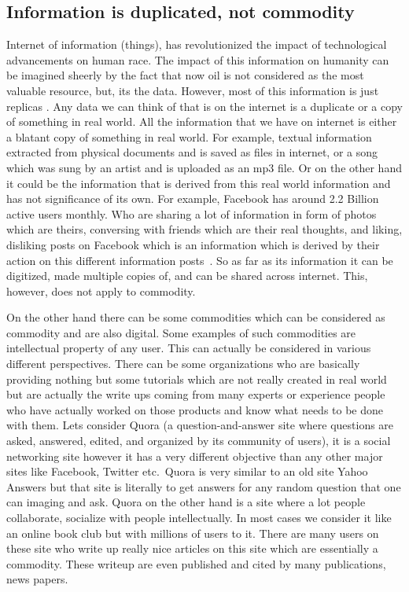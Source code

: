 \subsection{Information is duplicated, not commodity}

Internet of information (things), has revolutionized the impact of
technological advancements on human race. The impact of this
information on humanity can be imagined sheerly by the fact that now
oil is not considered as the most valuable resource, but, its the
data. However, most of this information is just replicas
\cite{economist5}. Any data we can think of that is on the internet is
a duplicate or a copy of something in real world. All the information
that we have on internet is either a blatant copy of something in real
world. For example, textual information extracted from physical
documents and is saved as files in internet, or a song which was sung
by an artist and is uploaded as an mp3 file. Or on the other hand it
could be the information that is derived from this real world
information and has not significance of its own. For example, Facebook
has around 2.2 Billion active users monthly. Who are sharing a lot of
information in form of photos which are theirs, conversing with
friends which are their real thoughts, and liking, disliking posts on
Facebook which is an information which is derived by their action on
this different information posts~\cite{statista6}. So as far as its
information it can be digitized, made multiple copies of, and can be
shared across internet. This, however, does not apply to commodity.


On the other hand there can be some commodities which can be
considered as commodity and are also digital. Some examples of such
commodities are intellectual property of any user. This can actually
be considered in various different perspectives. There can be some
organizations who are basically providing nothing but some tutorials
which are not really created in real world but are actually the write
ups coming from many experts or experience people who have actually
worked on those products and know what needs to be done with them.
Lets consider Quora (a question-and-answer site where
  questions are asked, answered, edited, and organized by its
  community of users), it is a social networking site however it has a
very different objective than any other major sites like Facebook,
Twitter etc.\ Quora is very similar to an old site Yahoo Answers but
that site is literally to get answers for any random question that one
can imaging and ask. Quora on the other hand is a site where a lot
people collaborate, socialize with people intellectually. In most
cases we consider it like an online book club but with millions of
users to it. There are many users on these site who write up really
nice articles on this site which are essentially a commodity. These
writeup are even published and cited by many publications, news
papers.

